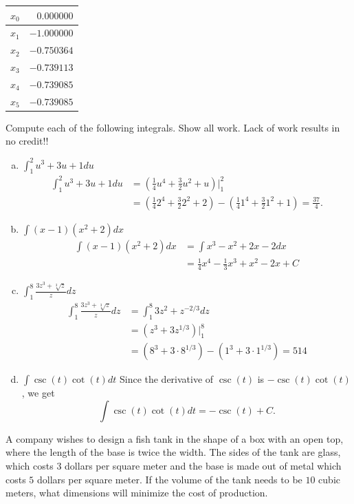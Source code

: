 \documentclass[11pt]{exam}
\theoremstyle{definition}
\begin{document}
\begin{questions}
\begin{center}
\begin{tabular}{c|r}
$x_0$  &  $0.000000$\\\hline
$x_1$  &  $-1.000000$\\\hline
$x_2$  &  $-0.750364$\\\hline
$x_3$  &  $-0.739113$\\\hline
$x_4$  &  $-0.739085$\\\hline
$x_5$  &  $-0.739085$
\end{tabular}
\end{center}

\newpage
\question[10]\mbox{}
Compute each of the following integrals.  Show all work.
Lack of work results in no credit!!
\begin{enumerate}[(a)]
\item $\int_1^2 u^3 + 3u + 1 du$
\begin{align*}
\int_1^2 u^3 + 3u + 1 du
  & = \left(\frac{1}{4}u^4 + \frac{3}{2}u^2 + u\right) |_1^2\\
  & = \left(\frac{1}{4}2^4 + \frac{3}{2}2^2 + 2\right) - \left(\frac{1}{4}1^4 + \frac{3}{2}1^2 + 1\right) = \frac{37}{4}.
\end{align*}
\item $\int (x-1)(x^2+2) dx$
\begin{align*}
\int (x-1)(x^2+2) dx
  & = \int x^3 - x^2 + 2x-2 dx\\
  & = \frac{1}{4}x^4 - \frac{1}{3}x^3 + x^2 - 2x + C
\end{align*}
\item $\int_1^8 \frac{3z^3 + \sqrt[3]{z}}{z}dz$
\begin{align*}
\int_1^8 \frac{3z^3 + \sqrt[3]{z}}{z}dz
  & = \int_1^8 3z^2 + z^{-2/3} dz\\
  & = (z^3 + 3z^{1/3})|_1^8\\
  & = (8^3 + 3\cdot 8^{1/3}) - (1^3 + 3\cdot 1^{1/3}) = 514
\end{align*}
\item $\int \csc(t)\cot(t)dt$
Since the derivative of $\csc(t)$ is $-\csc(t)\cot(t)$, we get
$$\int \csc(t)\cot(t)dt = -\csc(t) + C.$$
\end{enumerate}

\newpage
\question[10]\mbox{}

A company wishes to design a fish tank in the shape of a box with an open top, where the length of the base is twice the width.
The sides of the tank are glass, which costs $3$ dollars per square meter and the base is made out of metal which costs $5$ dollars per square meter.
If the volume of the tank needs to be $10$ cubic meters, what dimensions will minimize the cost of production.


\end{questions}
\end{document}
